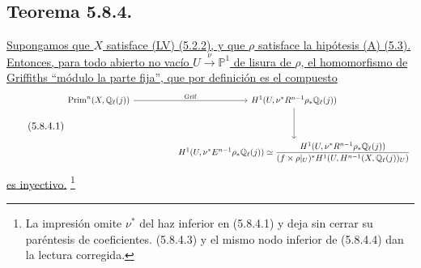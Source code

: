 \subsection*{Teorema 5.8.4.}
\underline{Supongamos que $X$ satisface (LV) (5.2.2), y que $\rho$
satisface la hipótesis (A) (5.3). Entonces, para todo abierto no vacío
$U\xrightarrow{\nu}\mathbb P^1$ de lisura de $\rho$, el homomorfismo de
Griffiths ``módulo la parte fija'', que por definición es el compuesto}
\begin{equation}\tag{5.8.4.1}
\resizebox{\textwidth}{!}{%
\begin{tikzcd}[ampersand replacement=\&,row sep=huge,column sep=huge]
\operatorname{Prim}^n(X,\mathbb Q_\ell(j))
  \arrow[r,"\operatorname{Grif}"]
\&
H^1(U,\nu^*R^{n-1}\rho_*\mathbb Q_\ell(j))
  \arrow[d]
\\
{}
\&
H^1(U,\sisi{}{\nu^*}E^{n-1}\rho_*\sisi{(}{}\mathbb Q_\ell(j))
\simeq
\dfrac{H^1(U,\nu^*R^{n-1}\rho_*\mathbb Q_\ell(j))}
{(f\times\rho|_U)^*
 H^1(U,H^{n-1}(X,\mathbb Q_\ell(j))_U)}
\end{tikzcd}}
\end{equation}
\underline{es inyectivo.}
\footnote{La impresión omite $\nu^*$ del haz inferior en (5.8.4.1)
y deja sin cerrar su paréntesis de coeficientes. (5.8.4.3) y el mismo
nodo inferior de (5.8.4.4) dan la lectura corregida.}

\pageoriginale

